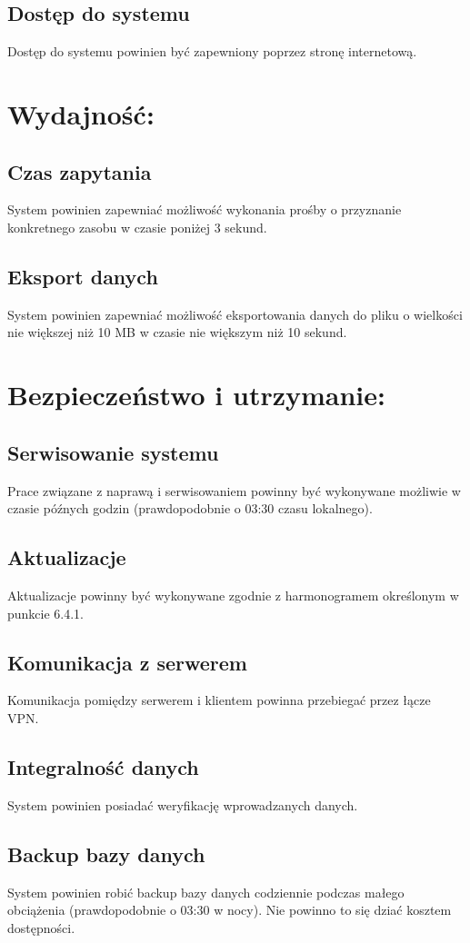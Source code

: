 \documentclass[11pt, a4paper, oneside]{report}
\begin{document}
\subsection{Dostęp do systemu}
Dostęp do systemu powinien być zapewniony poprzez stronę internetową.
\section{Wydajność:}
\subsection{Czas zapytania} 
System powinien zapewniać możliwość wykonania prośby o przyznanie konkretnego zasobu w czasie poniżej 3 sekund.
\subsection{Eksport danych}
System powinien zapewniać możliwość eksportowania danych do pliku o wielkości nie większej niż 10 MB w czasie nie większym niż 10 sekund.
\section{Bezpieczeństwo i utrzymanie:}
\subsection{Serwisowanie systemu}
Prace związane z naprawą i serwisowaniem powinny być wykonywane możliwie w czasie późnych godzin (prawdopodobnie o 03:30 czasu lokalnego).
\subsection{Aktualizacje}
Aktualizacje powinny być wykonywane zgodnie z harmonogramem określonym w punkcie 6.4.1.
\subsection{Komunikacja z serwerem}
Komunikacja pomiędzy serwerem i klientem powinna przebiegać przez łącze VPN.
\subsection{Integralność danych}
System powinien posiadać weryfikację wprowadzanych danych.
\subsection{Backup bazy danych}
System powinien robić backup bazy danych codziennie podczas małego obciążenia (prawdopodobnie o 03:30 w nocy). Nie powinno to się dziać kosztem dostępności.
\end{document}

